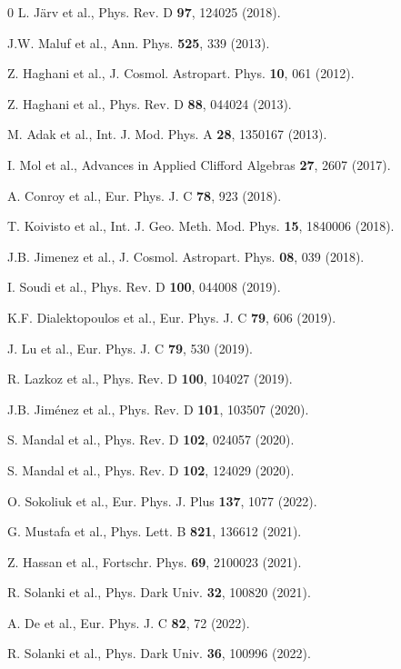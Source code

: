 \documentclass[showpacs,aps,amssymb,preprintnumbers,prd,amsmath,floatfix]{revtex4}
\begin{document}
\begin{thebibliography}{0}
L. Järv et al., Phys. Rev. D \textbf{97}, 124025 (2018).

J.W. Maluf et al., Ann. Phys. \textbf{525}, 339 (2013).

Z. Haghani et al., J. Cosmol. Astropart. Phys. \textbf{10}, 061 (2012).

Z. Haghani et al., Phys. Rev. D \textbf{88}, 044024 (2013).

M. Adak et al., Int. J. Mod. Phys. A \textbf{28}, 1350167 (2013).

I. Mol et al., Advances in Applied Clifford Algebras \textbf{27}, 2607 (2017).

A. Conroy et al.,  Eur. Phys. J. C \textbf{78}, 923 (2018). 

T. Koivisto et al., Int. J. Geo. Meth. Mod. Phys. \textbf{15}, 1840006 (2018).

J.B. Jimenez et al., J. Cosmol. Astropart. Phys. \textbf{08}, 039 (2018).

I. Soudi et al., Phys. Rev. D \textbf{100}, 044008 (2019).

K.F. Dialektopoulos et al., Eur. Phys. J. C \textbf{79}, 606 (2019).

J. Lu et al., Eur. Phys. J. C \textbf{79}, 530 (2019).

R. Lazkoz et al., Phys. Rev. D \textbf{100}, 104027 (2019).

J.B. Jiménez et al., Phys. Rev. D \textbf{101}, 103507 (2020).

S. Mandal et al., Phys. Rev. D \textbf{102}, 024057 (2020).

S. Mandal et al., Phys. Rev. D \textbf{102}, 124029 (2020).

O. Sokoliuk et al., Eur. Phys. J. Plus \textbf{137}, 1077 (2022). 

G. Mustafa et al., Phys. Lett. B \textbf{821}, 136612 (2021).

Z. Hassan et al., Fortschr. Phys. \textbf{69}, 2100023 (2021).


R. Solanki et al., Phys. Dark Univ. \textbf{32}, 100820 (2021).

A. De et al., Eur. Phys. J. C \textbf{82}, 72 (2022).

R. Solanki et al., Phys. Dark Univ. \textbf{36}, 100996 (2022).


\end{thebibliography}
\end{document}
